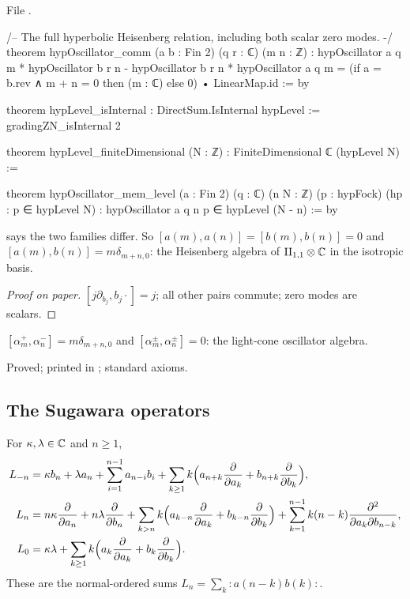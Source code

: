 \noindent File .
\begin{leancode}
/-- The full hyperbolic Heisenberg relation, including both scalar zero modes. -/
theorem hypOscillator_comm (a b : Fin 2) (q r : ℂ) (m n : ℤ) :
    hypOscillator a q m * hypOscillator b r n -
      hypOscillator b r n * hypOscillator a q m =
    (if a = b.rev ∧ m + n = 0 then (m : ℂ) else 0) • LinearMap.id := by

theorem hypLevel_isInternal : DirectSum.IsInternal hypLevel := gradingZN_isInternal 2

theorem hypLevel_finiteDimensional (N : ℤ) : FiniteDimensional ℂ (hypLevel N) :=

theorem hypOscillator_mem_level (a : Fin 2) (q : ℂ) (n N : ℤ) (p : hypFock)
    (hp : p ∈ hypLevel N) : hypOscillator a q n p ∈ hypLevel (N - n) := by
\end{leancode}

\begin{dictionary}
 says the two families differ.  So $[a(m),a(n)]=[b(m),b(n)]=0$ and $[a(m),b(n)]=m\delta_{m+n,0}$:
the Heisenberg algebra of ${\mathrm{II}_{1,1}}\otimes{\mathbb{C}}$ in the isotropic basis.
\end{dictionary}

\begin{proof}[Proof on paper]
$[j\partial_{b_j},b_j\cdot]=j$; all other pairs commute; zero modes are scalars.
\end{proof}

\begin{physics}
$[\alpha^+_m,\alpha^-_n]=m\delta_{m+n,0}$ and $[\alpha^\pm_m,\alpha^\pm_n]=0$: the light-cone oscillator algebra.
\end{physics}

\begin{status}
Proved; printed in ; standard axioms.
\end{status}

\subsection{The Sugawara operators}

\begin{definition}\label{ch17:def:hypsugawara}
For $\kappa,\lambda\in{\mathbb{C}}$ and $n\ge1$,
\begin{align*}
L_{-n}&=\kappa b_n+\lambda a_n+\sum_{i=1}^{n-1}a_{n-i}b_i+\sum_{k\ge1}k\Bigl(a_{n+k}\frac{\partial}{\partial a_k}+b_{n+k}\frac{\partial}{\partial b_k}\Bigr),\\
L_{n}&=n\kappa\frac{\partial}{\partial a_n}+n\lambda\frac{\partial}{\partial b_n}+\sum_{k>n}k\Bigl(a_{k-n}\frac{\partial}{\partial a_k}+b_{k-n}\frac{\partial}{\partial b_k}\Bigr)
  +\sum_{k=1}^{n-1}k(n-k)\frac{\partial^2}{\partial a_k\partial b_{n-k}},\\
L_0&=\kappa\lambda+\sum_{k\ge1}k\Bigl(a_k\frac{\partial}{\partial a_k}+b_k\frac{\partial}{\partial b_k}\Bigr).
\end{align*}
These are the normal-ordered sums $L_n=\sum_k{:}a(n-k)b(k){:}$.
\end{definition}


